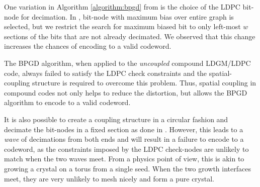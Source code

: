 One variation in Algorithm \ref{algorithm:bpgd} from \cite{Aref-arxiv13} is the choice of the LDPC bit-node for decimation.
In \cite{Aref-arxiv13}, bit-node with maximum bias over entire graph is selected, but we restrict the search for maximum biased bit to only left-most $w$ sections of the bits that are not already decimated.
We observed that this change increases the chances of encoding to a valid codeword.
\begin{remark}
  The BPGD algorithm, when applied to the \emph{uncoupled} compound LDGM/LDPC code, always failed to satisfy the LDPC check constraints and the spatial-coupling structure is required to overcome this problem.
  Thus, spatial coupling in compound codes not only helps to reduce the distortion, but allows the BPGD algorithm to encode to a valid codeword.
\end{remark}
It is also possible to create a coupling structure in a circular fashion and decimate the bit-nodes in a fixed section as done in \cite{Aref-isit12}.
However, this leads to a \emph{wave} of decimations from both ends and will result in a failure to encode to a codeword, as the constraints imposed by the LDPC check-nodes are unlikely to match when the two waves meet.
From a physics point of view, this is akin to growing a crystal on a torus from a single seed.
When the two growth interfaces meet, they are very unlikely to mesh nicely and form a pure crystal.

